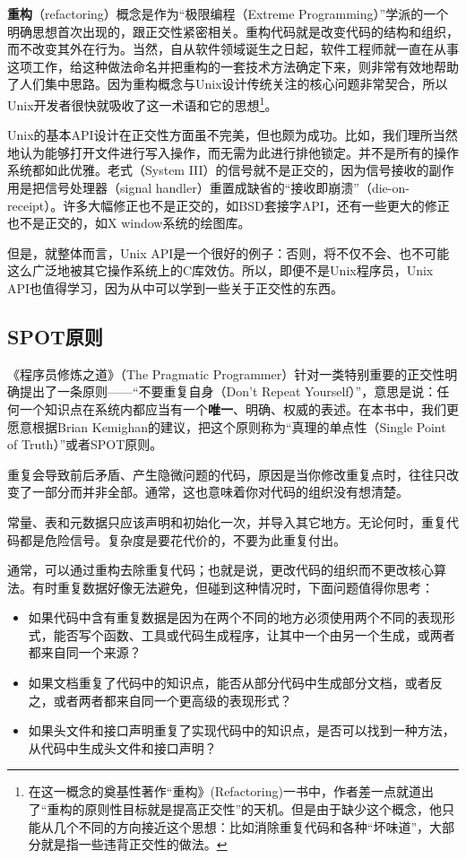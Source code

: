 \documentclass[12pt,oneside]{book}
\begin{document}
\begin{common-format}
\textbf{重构}（refactoring）概念是作为“极限编程（Extreme Programming）”学派的一个明确思想首次出现的，跟正交性紧密相关。重构代码就是改变代码的结构和组织，而不改变其外在行为。当然，自从软件领域诞生之日起，软件工程师就一直在从事这项工作，给这种做法命名并把重构的一套技术方法确定下来，则非常有效地帮助了人们集中思路。因为重构概念与Unix设计传统关注的核心问题非常契合，所以Unix开发者很快就吸收了这一术语和它的思想\footnote{在这一概念的奠基性著作“重构》(Refactoring)\cite{Fowler}一书中，作者差一点就道出了“重构的原则性目标就是提高正交性”的天机。但是由于缺少这个概念，他只能从几个不同的方向接近这个思想：比如消除重复代码和各种“坏味道”，大部分就是指一些违背正交性的做法。}。

Unix的基本API设计在正交性方面虽不完美，但也颇为成功。比如，我们理所当然地认为能够打开文件进行写入操作，而无需为此进行排他锁定。并不是所有的操作系统都如此优雅。老式（System III）的信号就不是正交的，因为信号接收的副作用是把信号处理器（signal handler）重置成缺省的“接收即崩溃”（die-on-receipt）。许多大幅修正也不是正交的，如BSD套接字API，还有一些更大的修正也不是正交的，如X window系统的绘图库。

但是，就整体而言，Unix API是一个很好的例子：否则，将不仅不会、也不可能这么广泛地被其它操作系统上的C库效仿。所以，即便不是Unix程序员，Unix API也值得学习，因为从中可以学到一些关于正交性的东西。


\subsection{SPOT原则}
《程序员修炼之道》（The Pragmatic Programmer）针对一类特别重要的正交性明确提出了一条原则——“不要重复自身（Don't Repeat Yourself）”，意思是说：任何一个知识点在系统内都应当有一个\textbf{唯一}、明确、权威的表述。在本书中，我们更愿意根据Brian Kemighan的建议，把这个原则称为“真理的单点性（Single Point of Truth）”或者SPOT原则。

重复会导致前后矛盾、产生隐微问题的代码，原因是当你修改重复点时，往往只改变了一部分而并非全部。通常，这也意味着你对代码的组织没有想清楚。

常量、表和元数据只应该声明和初始化一次，并导入其它地方。无论何时，重复代码都是危险信号。复杂度是要花代价的，不要为此重复付出。

通常，可以通过重构去除重复代码；也就是说，更改代码的组织而不更改核心算法。有时重复数据好像无法避免，但碰到这种情况时，下面问题值得你思考：

\begin{itemize}
\item 如果代码中含有重复数据是因为在两个不同的地方必须使用两个不同的表现形式，能否写个函数、工具或代码生成程序，让其中一个由另一个生成，或两者都来自同一个来源？
\item 如果文档重复了代码中的知识点，能否从部分代码中生成部分文档，或者反之，或者两者都来自同一个更高级的表现形式？
\item 如果头文件和接口声明重复了实现代码中的知识点，是否可以找到一种方法，从代码中生成头文件和接口声明？
\end{itemize}


\end{common-format}
\end{document}
